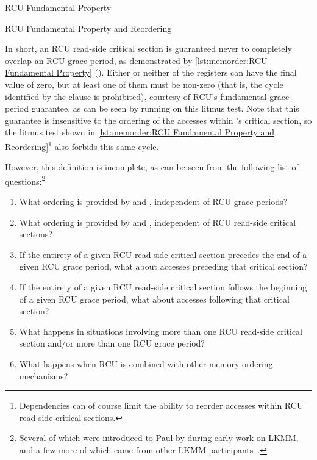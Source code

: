\begin{listing}

\caption{RCU Fundamental Property}
\label{lst:memorder:RCU Fundamental Property}
\end{listing}

\begin{listing}

\caption{RCU Fundamental Property and Reordering}
\label{lst:memorder:RCU Fundamental Property and Reordering}
\end{listing}

In short, an RCU read-side critical section is guaranteed never to
completely overlap an RCU grace period, as demonstrated by
\cref{lst:memorder:RCU Fundamental Property}
().
Either or neither of the  registers can have the final value of zero,
but at least one of them must be non-zero (that is, the cycle identified
by the  clause is prohibited), courtesy of RCU's fundamental
grace-period guarantee, as can be seen by running  on this litmus test.
Note that this guarantee is insensitive to the ordering of the accesses
within 's critical section, so the litmus test shown in
\cref{lst:memorder:RCU Fundamental Property and Reordering}\footnote{
	Dependencies can of course limit the ability to reorder accesses
	within RCU read-side critical sections.}
also forbids this same cycle.

However, this definition is incomplete, as can be seen from the following
list of questions:\footnote{
	Several of which were introduced to Paul by  during
	early work on LKMM, and a few more of which came from other
	LKMM participants~\cite{Alglave:2018:FSC:3173162.3177156}.}

\begin{enumerate}
\item	What ordering is provided by 
	and , independent of RCU grace periods?
\item	What ordering is provided by 
	and , independent of RCU read-side
	critical sections?
\item	If the entirety of a given RCU read-side critical section
	precedes the end of a given RCU grace period, what about
	accesses preceding that critical section?
\item	If the entirety of a given RCU read-side critical section
	follows the beginning of a given RCU grace period, what about
	accesses following that critical section?
\item	What happens in situations involving more than one RCU read-side
	critical section and/or more than one RCU grace period?
\item	What happens when RCU is combined with other memory-ordering
	mechanisms?
\end{enumerate}

